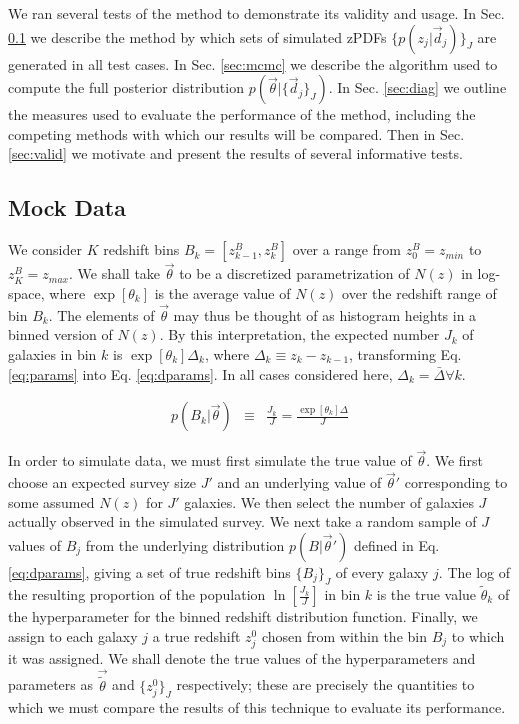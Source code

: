 \documentclass[preprint]{aastex}
\begin{document}
We ran several tests of the method to demonstrate its validity and usage.  In Sec. \ref{sec:mock} we describe the method by which sets of simulated zPDFs $\{p(z_{j}|\vec{d}_{j})\}_{J}$ are generated in all test cases.  In Sec. \ref{sec:mcmc} we describe the algorithm used to compute the full posterior distribution $p(\vec{\theta}|\{\vec{d}_{j}\}_{J})$.  In Sec. \ref{sec:diag} we outline the measures used to evaluate the performance of the method, including the competing methods with which our results will be compared.  Then in Sec. \ref{sec:valid} we motivate and present the results of several informative tests.

\subsection{Mock Data}
\label{sec:mock}

We consider $K$ redshift bins $B_{k}=[z^{B}_{k-1},z^{B}_{k}]$ over a range from $z^{B}_{0}=z_{min}$ to $z^{B}_{K}=z_{max}$.  We shall take $\vec{\theta}$ to be a discretized parametrization of $N(z)$ in log-space, where $\exp[\theta_{k}]$ is the average value of $N(z)$ over the redshift range of bin $B_{k}$.   The elements of $\vec{\theta}$ may thus be thought of as histogram heights in a binned version of $N(z)$.  By this interpretation, the expected number $J_{k}$ of galaxies in bin $k$ is $\exp[\theta_{k}]\Delta_{k}$, where $\Delta_{k}\equiv z_{k}-z_{k-1}$, transforming Eq. \ref{eq:params} into Eq. \ref{eq:dparams}.  In all cases considered here, $\Delta_{k}=\bar{\Delta}\forall k$.

\begin{eqnarray}
\label{eq:dparams}
p(B_{k}|\vec{\theta}) &\equiv& \frac{J_{k}}{J} = \frac{\exp[\theta_{k}]\Delta}{J}
\end{eqnarray}

In order to simulate data, we must first simulate the true value of $\vec{\theta}$.  We first choose an expected survey size $J'$ and an underlying value of $\vec{\theta}'$ corresponding to some assumed $N(z)$ for $J'$ galaxies.  We then select the number of galaxies $J$ actually observed in the simulated survey.  We next take a random sample of $J$ values of $B_{j}$ from the underlying distribution $p(B|\vec{\theta}')$ defined in Eq. \ref{eq:dparams}, giving a set of true redshift bins $\{B_{j}\}_{J}$ of every galaxy $j$.  The log of the resulting proportion of the population $\ln[\frac{J_{k}}{J}]$ in bin $k$ is the true value $\tilde{\theta}_{k}$ of the hyperparameter for the binned redshift distribution function.  Finally, we assign to each galaxy $j$ a true redshift $z_{j}^{0}$ chosen from within the bin $B_{j}$ to which it was assigned.  We shall denote the true values of the hyperparameters and parameters as $\vec{\tilde{\theta}}$ and $\{z_{j}^{0}\}_{J}$ respectively; these are precisely the quantities to which we must compare the results of this technique to evaluate its performance.
\end{document}
